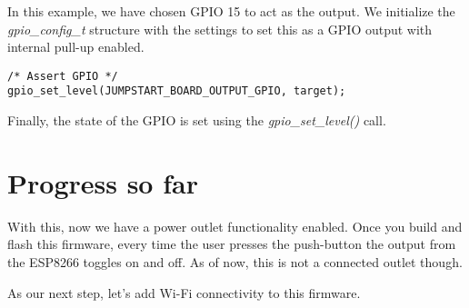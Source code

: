 \documentclass[main.tex]{subfiles}
\begin{document}
In this example, we have chosen GPIO 15 to act as the output. We initialize the \textit{gpio\_config\_t} structure with the settings to set this as a GPIO output with internal pull-up enabled.

\begin{verbatim}
/* Assert GPIO */
gpio_set_level(JUMPSTART_BOARD_OUTPUT_GPIO, target);

\end{verbatim}

Finally, the state of the GPIO is set using the \textit{gpio\_set\_level()} call.

\section{Progress so far}
With this, now we have a power outlet functionality enabled. Once you build and flash this firmware, every time the user presses the push-button the output from the ESP8266 toggles on and off. As of now, this is not a connected outlet though. 

As our next step, let's add Wi-Fi connectivity to this firmware.
\end{document}
